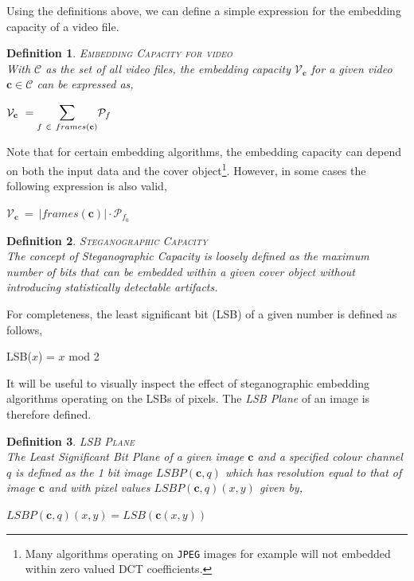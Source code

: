\documentclass[paper=a4, fontsize=11pt,twoside]{scrartcl}    %
\numberwithin{table}{section}
\numberwithin{figure}{section}
\numberwithin{algorithm}{section}
\newtheorem{ddef}{Definition}[section]
\begin{document}
Using the definitions above, we can define a simple expression for the embedding capacity of a video file. 
\begin{ddef}
\textsc{Embedding Capacity for video}\\[5pt]
With $\mathcal{C}$ as the set of all video files, the embedding capacity $\mathcal{V} _{\textbf{c}}$ for a given video $\textbf{c} \in \mathcal{C}$ can be expressed as,
\begin{center}
	$\mathcal{V} _{\textbf{c}} ~= \mathlarger{\mathlarger{\sum}}\limits_{f ~\in ~frames(\textbf{c})} \mathcal{P} _{f}$
\end{center}
\end{ddef}
\noindent
Note that for certain embedding algorithms, the embedding capacity can depend on both the input data and the cover object\footnote{Many algorithms operating on \texttt{JPEG} images for example will not embedded within zero valued DCT coefficients.}. However, in some cases the following expression is also valid,
\begin{center}
	$\mathcal{V} _{\textbf{c}} ~=~ |frames(\textbf{c})| \cdot \mathcal{P} _{f _{0}}$
\end{center}

\begin{ddef}
\textsc{Steganographic Capacity}\\[5pt]
The concept of Steganographic Capacity is loosely defined as the maximum number of bits that can be embedded within a given cover object without introducing statistically detectable artifacts. %
\end{ddef}
\noindent
For completeness, the least significant bit (LSB) of a given number is defined as follows,
\begin{center}
	LSB($x$) = $x$ mod 2
\end{center}

\noindent
It will be useful to visually inspect the effect of steganographic embedding algorithms operating on the LSBs of pixels. The \textit{LSB Plane} of an image is therefore defined.

\begin{ddef}
\textsc{LSB Plane}\\[5pt]
The Least Significant Bit Plane of a given image $\mathcal{\textbf{c}}$ and a specified colour channel $q$ is defined as the 1 bit image $LSBP(\mathcal{\textbf{c}},q)$ which has resolution equal to that of image $\mathcal{\textbf{c}}$ and with pixel values  $LSBP(\mathcal{\textbf{c}},q)(x,y)$ given by,
\begin{center}
	$LSBP(\mathcal{\textbf{c}},q)(x,y) = LSB(\mathcal{\textbf{c}}(x,y))$
\end{center} 
\end{ddef}
\end{document}
